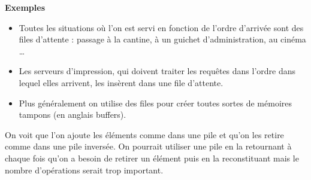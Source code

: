 \begin{center}
\end{center}{\bf Exemples}
\begin{itemize}
\item Toutes les situations où l'on est servi en fonction de l'ordre d'arrivée sont des files d'attente : passage à la cantine, à un guichet d'administration, au cinéma \dots

\item Les serveurs d'impression, qui doivent traiter les requêtes dans l'ordre dans lequel elles
arrivent, les insèrent dans une file d'attente.

\item Plus généralement on utilise des files pour créer toutes sortes de mémoires tampons (en anglais
buffers).
\end{itemize}

On voit que l'on ajoute les éléments comme dans une pile et qu'on les retire comme dans une pile inversée. On pourrait utiliser une pile en la retournant à chaque fois qu'on a besoin de retirer un élément puis en la reconstituant mais le nombre d'opérations serait trop important. 

